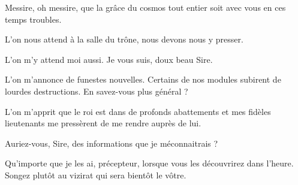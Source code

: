 \nopagebreak[4]
\begin{drama}\nopagebreak[4]
  \nopagebreak[4]\generalspeaks \nopagebreak[4] Messire, oh messire, que la grâce du cosmos tout entier soit avec vous en ces temps troubles.

  \elenaspeaks L’on nous attend à la salle du trône, nous devons nous y presser.

  \generalspeaks L’on m’y attend moi aussi. Je vous suis, doux beau Sire.

  \alexasspeaks L’on m’annonce de funestes nouvelles. Certains de nos modules subirent de lourdes destructions. En savez-vous plus général ?

  \generalspeaks L’on m’apprit que le roi est dans de profonds abattements et mes fidèles lieutenants me pressèrent de me rendre auprès de lui.

  \alexasspeaks {} Auriez-vous, Sire, des informations que je méconnaitrais ?

  \elenaspeaks Qu’importe que je les ai, précepteur, lorsque vous les découvrirez dans l’heure. Songez plutôt au vizirat qui sera bientôt le vôtre.
\end{drama}


\scene


\StageDirII{\roi, \reine, \elena, \alexas, \general, \suivantes, \kingsgards}




